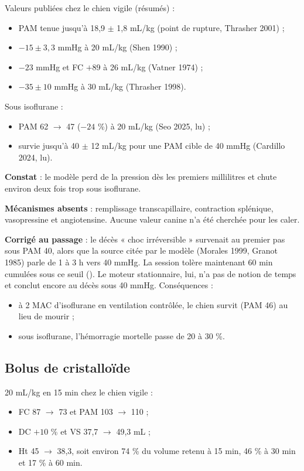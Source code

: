 \documentclass[10pt,a4paper]{article}
\newcommand{\vp}[1]{\path{#1}}
\begin{document}
Valeurs publiées chez le chien vigile (résumés) :
\begin{itemize}
\item PAM tenue jusqu'à 18,9 $\pm$ 1,8 mL/kg (point de rupture, Thrasher 2001) ;
\item $-15 \pm 3{,}3$ mmHg à 20 mL/kg (Shen 1990) ;
\item $-23$ mmHg et FC $+89$ à 26 mL/kg (Vatner 1974) ;
\item $-35 \pm 10$ mmHg à 30 mL/kg (Thrasher 1998).
\end{itemize}

Sous isoflurane :
\begin{itemize}
\item PAM 62 $\to$ 47 ($-24$ \%) à 20 mL/kg (Seo 2025, lu) ;
\item survie jusqu'à 40 $\pm$ 12 mL/kg pour une PAM cible de 40 mmHg (Cardillo 2024, lu).
\end{itemize}

\textbf{Constat} : le modèle perd de la pression dès les premiers millilitres et chute environ deux fois trop sous isoflurane.

\textbf{Mécanismes absents} : remplissage transcapillaire, contraction splénique, vasopressine et angiotensine. Aucune valeur canine n'a été cherchée pour les caler.

\textbf{Corrigé au passage} : le décès « choc irréversible » survenait au premier pas sous PAM 40, alors que la source citée par le modèle (Morales 1999, Granot 1985) parle de 1 à 3 h vers 40 mmHg. La session tolère maintenant 60 min cumulées sous ce seuil (\vp{shock_tol_min}). Le moteur stationnaire, lui, n'a pas de notion de temps et conclut encore au décès sous 40 mmHg. Conséquences :
\begin{itemize}
\item à 2 MAC d'isoflurane en ventilation contrôlée, le chien survit (PAM 46) au lieu de mourir ;
\item sous isoflurane, l'hémorragie mortelle passe de 20 à 30 \%.
\end{itemize}

\subsection{Bolus de cristalloïde}
20 mL/kg en 15 min chez le chien vigile :
\begin{itemize}
\item FC 87 $\to$ 73 et PAM 103 $\to$ 110 ;
\item DC $+10$ \% et VS 37,7 $\to$ 49,3 mL ;
\item Ht 45 $\to$ 38,3, soit environ 74 \% du volume retenu à 15 min, 46 \% à 30 min et 17 \% à 60 min.
\end{itemize}
\end{document}
